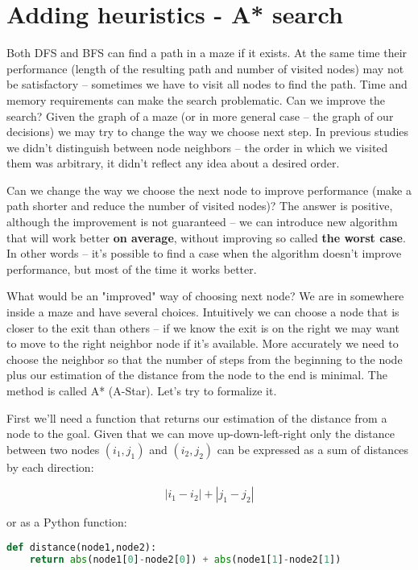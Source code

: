 \section{Adding heuristics - A* search}

Both DFS and BFS can find a path in a maze if it exists.
At the same time their performance (length of the resulting
path and number of visited nodes) may not be satisfactory -- 
sometimes we have to visit all nodes to find the path.
Time and memory requirements can make the search problematic.
Can we improve the search? Given the graph of a maze
(or in more general case -- the graph of our decisions)
we may try to change the way we choose next step. In
previous studies we didn't distinguish between node neighbors --
the order in which we visited them was arbitrary, 
it didn't reflect any idea about a desired order.

Can we change the way we choose the next node to improve
performance (make a path shorter and reduce the number of
visited nodes)? The answer is positive, although the improvement
is not guaranteed -- we can introduce new algorithm that will
work better \textbf{on average}, without improving so called
\textbf{the worst case}. In other words -- it's possible to find
a case when the algorithm doesn't improve performance, but
most of the time it works better.

What would be an "improved" way of choosing next node?
We are in somewhere inside a maze and have several choices.
Intuitively we can choose a node that is closer to the exit than others --
if we know the exit is on the right we may want to move to the
right neighbor node if it's available. More accurately we
need to choose the neighbor so that the number of steps
from the beginning to the node plus our estimation of
the distance from the node to the end is minimal. The method
is called A* (A-Star). Let's try to formalize it.

First we'll need a function that returns our estimation
of the distance from a node to the goal. Given that we can move
up-down-left-right only the distance between two nodes
$(i_1,j_1)$ and $(i_2,j_2)$ can be expressed as a sum of
distances by each direction:

$$ |i_1-i_2| + |j_1-j_2| $$

or as a Python function:
\begin{lstlisting}[language=Python,style=codelst2,caption={Distance between nodes}]
def distance(node1,node2):
    return abs(node1[0]-node2[0]) + abs(node1[1]-node2[1])
\end{lstlisting}

